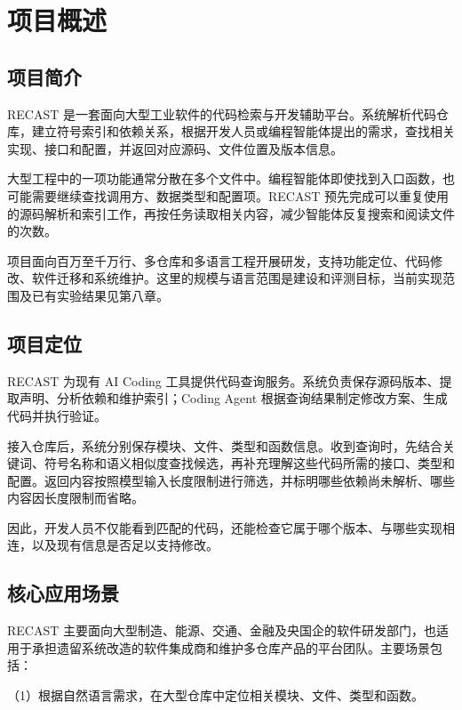\chapter{项目概述}
\label{chap:overview}

\section{项目简介}

RECAST 是一套面向大型工业软件的代码检索与开发辅助平台。系统解析代码仓库，建立符号索引和依赖关系，根据开发人员或编程智能体提出的需求，查找相关实现、接口和配置，并返回对应源码、文件位置及版本信息。

大型工程中的一项功能通常分散在多个文件中。编程智能体即使找到入口函数，也可能需要继续查找调用方、数据类型和配置项。RECAST 预先完成可以重复使用的源码解析和索引工作，再按任务读取相关内容，减少智能体反复搜索和阅读文件的次数。

项目面向百万至千万行、多仓库和多语言工程开展研发，支持功能定位、代码修改、软件迁移和系统维护。这里的规模与语言范围是建设和评测目标，当前实现范围及已有实验结果见第八章。

\section{项目定位}

RECAST 为现有 AI Coding 工具提供代码查询服务。系统负责保存源码版本、提取声明、分析依赖和维护索引；Coding Agent 根据查询结果制定修改方案、生成代码并执行验证。

接入仓库后，系统分别保存模块、文件、类型和函数信息。收到查询时，先结合关键词、符号名称和语义相似度查找候选，再补充理解这些代码所需的接口、类型和配置。返回内容按照模型输入长度限制进行筛选，并标明哪些依赖尚未解析、哪些内容因长度限制而省略。

因此，开发人员不仅能看到匹配的代码，还能检查它属于哪个版本、与哪些实现相连，以及现有信息是否足以支持修改。

\section{核心应用场景}

RECAST 主要面向大型制造、能源、交通、金融及央国企的软件研发部门，也适用于承担遗留系统改造的软件集成商和维护多仓库产品的平台团队。主要场景包括：

（1）根据自然语言需求，在大型仓库中定位相关模块、文件、类型和函数。

